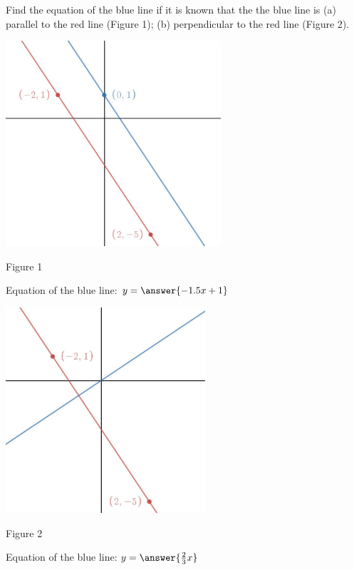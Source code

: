 \documentclass{ximera}
\begin{document}
\begin{problem}\label{prob:160hom4prob6}
Find the equation of the blue line if it is known that the the blue line is (a) parallel to the red line (Figure 1); (b) perpendicular to the red line (Figure 2).
\begin{image}
   \includegraphics[height=3in]{160H4pic5.jpg}
 \end{image}
 \begin{center}
     Figure 1
 \end{center}
 Equation of the blue line: $y=\answer{-1.5x+1}$
 \begin{image}
   \includegraphics[height=3in]{160H4pic6.jpg}
 \end{image}
 \begin{center}
     Figure 2
 \end{center}
  Equation of the blue line: $y=\answer{\frac{2}{3}x}$
\end{problem}
\end{document}
